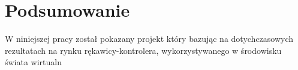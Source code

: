 \chapter{Podsumowanie}
\label{ch:podsumowanie}
W niniejszej pracy został pokazany projekt który bazując na dotychczasowych rezultatach na rynku rękawicy-kontrolera, wykorzystywanego w środowisku świata wirtualn